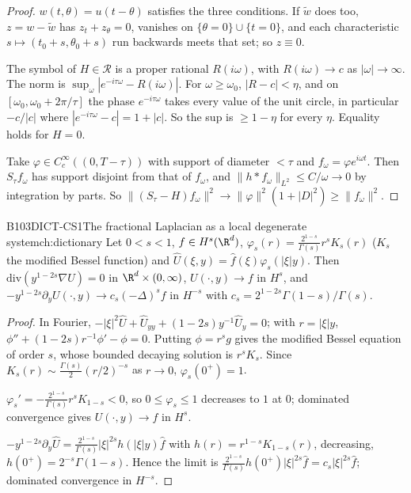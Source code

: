 \begin{proof}
$w(t,\theta)=u(t-\theta)$ satisfies the three conditions. If $\tilde w$ does too, $z=w-\tilde w$ has $z_t+z_\theta=0$, vanishes on $\{\theta=0\}\cup\{t=0\}$, and each characteristic $s\mapsto(t_0+s,\theta_0+s)$ run backwards meets that set; so $z\equiv0$.

The symbol of $H\in\mathcal R$ is a proper rational $R(i\omega)$, with $R(i\omega)\to c$ as $|\omega|\to\infty$. The norm is $\sup_\omega|e^{-i\tau\omega}-R(i\omega)|$. For $\omega\ge\omega_0$, $|R-c|<\eta$, and on $[\omega_0,\omega_0+2\pi/\tau]$ the phase $e^{-i\tau\omega}$ takes every value of the unit circle, in particular $-c/|c|$ where $|e^{-i\tau\omega}-c|=1+|c|$. So the sup is $\ge1-\eta$ for every $\eta$. Equality holds for $H=0$.

Take $\varphi\in C^\infty_c((0,T-\tau))$ with support of diameter $<\tau$ and $f_\omega=\varphi e^{i\omega t}$. Then $S_\tau f_\omega$ has support disjoint from that of $f_\omega$, and $\|h*f_\omega\|_{L^2}\le C/\omega\to0$ by integration by parts. So $\|(S_\tau-H)f_\omega\|^2\to\|\varphi\|^2(1+|D|^2)\ge\|f_\omega\|^2$.

\end{proof}

\begin{dimcard}{B103}{DICT-CS1}{The fractional Laplacian as a local degenerate system}{\pw}{ch:dictionary}
Let $0<s<1$, $f\in H^s(\R^d)$, $\varphi_s(r)=\frac{2^{1-s}}{\Gamma(s)}r^sK_s(r)$ ($K_s$ the modified Bessel function) and $\hat U(\xi,y)=\hat f(\xi)\varphi_s(|\xi|y)$. Then $\mathrm{div}(y^{1-2s}\nabla U)=0$ in $\R^d\times(0,\infty)$, $U(\cdot,y)\to f$ in $H^s$, and $-y^{1-2s}\partial_yU(\cdot,y)\to c_s(-\Delta)^sf$ in $H^{-s}$ with $c_s=2^{1-2s}\Gamma(1-s)/\Gamma(s)$.
\end{dimcard}

\begin{proof}
In Fourier, $-|\xi|^2\hat U+\hat U_{yy}+(1-2s)y^{-1}\hat U_y=0$; with $r=|\xi|y$, $\phi''+(1-2s)r^{-1}\phi'-\phi=0$. Putting $\phi=r^sg$ gives the modified Bessel equation of order $s$, whose bounded decaying solution is $r^sK_s$. Since $K_s(r)\sim\frac{\Gamma(s)}2(r/2)^{-s}$ as $r\to0$, $\varphi_s(0^+)=1$.

$\varphi_s'=-\frac{2^{1-s}}{\Gamma(s)}r^sK_{1-s}<0$, so $0\le\varphi_s\le1$ decreases to $1$ at $0$; dominated convergence gives $U(\cdot,y)\to f$ in $H^s$.

$-y^{1-2s}\partial_y\hat U=\frac{2^{1-s}}{\Gamma(s)}|\xi|^{2s}h(|\xi|y)\hat f$ with $h(r)=r^{1-s}K_{1-s}(r)$, decreasing, $h(0^+)=2^{-s}\Gamma(1-s)$. Hence the limit is $\frac{2^{1-s}}{\Gamma(s)}h(0^+)|\xi|^{2s}\hat f=c_s|\xi|^{2s}\hat f$; dominated convergence in $H^{-s}$.

\end{proof}


